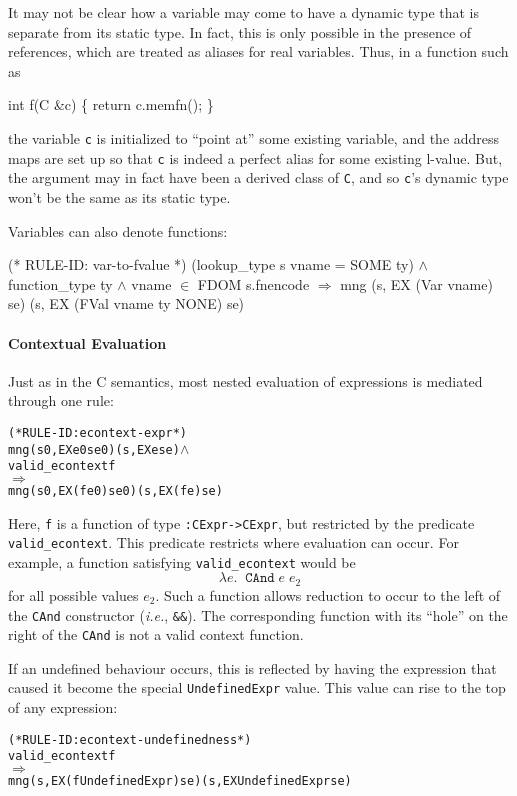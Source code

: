 \documentclass[11pt]{article}
\newcommand{\ie}{\emph{i.e.}}
\begin{document}
It may not be clear how a variable may come to have a dynamic type
that is separate from its static type.  In fact, this is only possible
in the presence of references, which are treated as aliases for real
variables.  Thus, in a function such as
\begin{stdrule}
   int f(C &c) \{ return c.memfn(); \}
\end{stdrule}
the variable \texttt{c} is initialized to ``point at'' some existing
variable, and the address maps are set up so that \texttt{c} is indeed
a perfect alias for some existing l-value.  But, the argument may in
fact have been a derived class of \texttt{C}, and so \texttt{c}'s
dynamic type won't be the same as its static type.

Variables can also denote functions:
%
%
\begin{stdrule}
(* RULE-ID: var-to-fvalue *)
     (lookup_type s vname = SOME ty) \(\land\)
     function_type ty \(\land\)
     vname \(\in\) FDOM s.fnencode
   \(\Rightarrow\)
     mng (s, EX (Var vname) se) (s, EX (FVal vname ty NONE) se)
\end{stdrule}


\paragraph{Contextual Evaluation}
Just as in the C semantics, most nested evaluation of expressions is
mediated through one rule: \label{rule:econtext-expr}
\begin{alltt}
(* RULE-ID: econtext-expr *)
     mng (s0, EX e0 se0) (s, EX e se) \(\land\)
     valid_econtext f
   \(\Rightarrow\)
     mng (s0, EX (f e0) se0) (s, EX (f e) se)
\end{alltt}
Here, \texttt{f} is a function of type \texttt{:CExpr->CExpr},
but restricted by the predicate \texttt{valid_econtext}.  This
predicate restricts where evaluation can occur.  For example, a
function satisfying \texttt{valid_econtext} would be
\[
\lambda e.\;\;\texttt{CAnd}\;e\;e_2
\]
for all possible values $e_2$.  Such a function allows reduction to
occur to the left of the \texttt{CAnd} constructor (\ie,
\texttt{\&\&}).  The corresponding function with its ``hole'' on the
right of the \texttt{CAnd} is not a valid context function.

If an undefined behaviour occurs, this is reflected by having the
expression that caused it become the special \texttt{UndefinedExpr}
value.  This value can rise to the top of any expression:
%
\begin{alltt}
(* RULE-ID: econtext-undefinedness *)
     valid_econtext f
   \(\Rightarrow\)
     mng (s, EX (f UndefinedExpr) se) (s, EX UndefinedExpr se)
\end{alltt}
\end{document}
